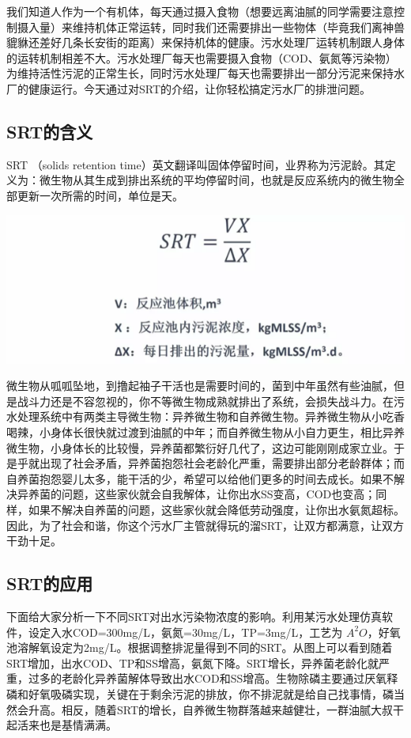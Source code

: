 \documentclass[]{book}
\begin{document}
我们知道人作为一个有机体，每天通过摄入食物（想要远离油腻的同学需要注意控制摄入量）来维持机体正常运转，同时我们还需要排出一些物体（毕竟我们离神兽貔貅还差好几条长安街的距离）来保持机体的健康。污水处理厂运转机制跟人身体的运转机制相差不大。污水处理厂每天也需要摄入食物（COD、氨氮等污染物）为维持活性污泥的正常生长，同时污水处理厂每天也需要排出一部分污泥来保持水厂的健康运行。今天通过对SRT的介绍，让你轻松搞定污水厂的排泄问题。

\subsection{SRT的含义}\label{srt}

SRT （solids retention
time）英文翻译叫固体停留时间，业界称为污泥龄。其定义为：微生物从其生成到排出系统的平均停留时间，也就是反应系统内的微生物全部更新一次所需的时间，单位是天。

\includegraphics[width=8.33in]{images/srt1}

微生物从呱呱坠地，到撸起袖子干活也是需要时间的，菌到中年虽然有些油腻，但是战斗力还是不容忽视的，你不等微生物成熟就排出了系统，会损失战斗力。在污水处理系统中有两类主导微生物：异养微生物和自养微生物。异养微生物从小吃香喝辣，小身体长很快就过渡到油腻的中年；而自养微生物从小自力更生，相比异养微生物，小身体长的比较慢，异养菌都繁衍好几代了，这边可能刚刚成家立业。于是乎就出现了社会矛盾，异养菌抱怨社会老龄化严重，需要排出部分老龄群体；而自养菌抱怨婴儿太多，能干活的少，希望可以给他们更多的时间去成长。如果不解决异养菌的问题，这些家伙就会自我解体，让你出水SS变高，COD也变高；同样，如果不解决自养菌的问题，这些家伙就会降低劳动强度，让你出水氨氮超标。因此，为了社会和谐，你这个污水厂主管就得玩的溜SRT，让双方都满意，让双方干劲十足。

\subsection{SRT的应用}\label{srt}

下面给大家分析一下不同SRT对出水污染物浓度的影响。利用某污水处理仿真软件，设定入水COD=300mg/L，氨氮=30mg/L，TP=3mg/L，工艺为
\(A^2O\)，好氧池溶解氧设定为2mg/L。根据调整排泥量得到不同的SRT。从图上可以看到随着SRT增加，出水COD、TP和SS增高，氨氮下降。SRT增长，异养菌老龄化就严重，过多的老龄化异养菌解体导致出水COD和SS增高。生物除磷主要通过厌氧释磷和好氧吸磷实现，关键在于剩余污泥的排放，你不排泥就是给自己找事情，磷当然会升高。相反，随着SRT的增长，自养微生物群落越来越健壮，一群油腻大叔干起活来也是基情满满。
\end{document}
